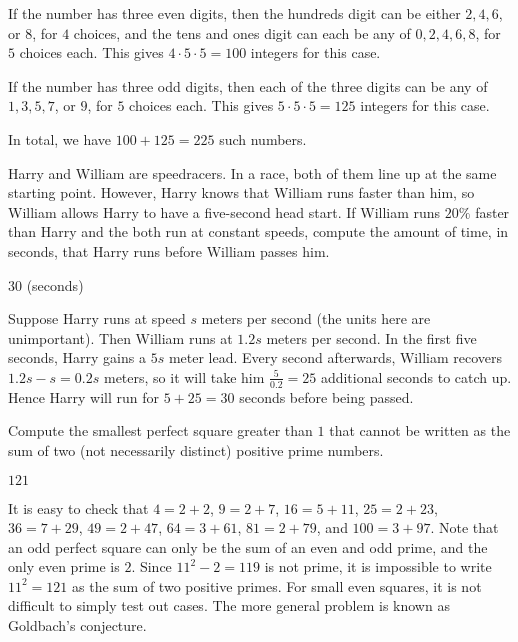 \documentclass[11pt]{article}
\begin{document}
\begin{solution}
If the number has three even digits, then the hundreds digit can be either $2, 4, 6$, or $8$, for $4$ choices,
and the tens and ones digit can each be any of $0, 2, 4, 6, 8$, for $5$ choices each.
This gives $4 \cdot 5 \cdot 5 = 100$ integers for this case. \newline

If the number has three odd digits, then each of the three digits can be any of $1, 3, 5, 7$, or $9$, for
$5$ choices each. This gives $5 \cdot 5 \cdot 5 = 125$ integers for this case. \newline

In total, we have $100 + 125 = \boxed{225}$ such numbers.
\end{solution}


\begin{problem}%
Harry and William are speedracers. In a race, both of them line up at the same starting point.
However, Harry knows that William runs faster than him, so William allows Harry to have
a five-second head start. If William runs $20\%$ faster than Harry and the both run at
constant speeds, compute the amount of time, in seconds, that Harry runs before William passes him.
\end{problem}

\begin{answer}
$\boxed{30}$ (seconds)
\end{answer}

\begin{solution}
Suppose Harry runs at speed $s$ meters per second (the units here are unimportant). Then William
runs at $1.2s$ meters per second. In the first five seconds, Harry gains a $5s$ meter lead.
Every second afterwards, William recovers $1.2s - s = 0.2s$ meters, so it will take
him $\frac{5}{0.2} = 25$ additional seconds to catch up. Hence Harry will run for $5 + 25 = \boxed{30}$
seconds before being passed.
\end{solution}


\begin{problem}%
Compute the smallest perfect square greater than $1$ that cannot be written as the sum of two
(not necessarily distinct) positive prime numbers.
\end{problem}

\begin{answer}
$\boxed{121}$
\end{answer}

\begin{solution}
It is easy to check that $4 = 2+2$, $9 = 2+7$, $16 = 5+11$, $25 = 2+23$, $36 = 7+29$, $49 = 2+47$,
$64 = 3+61$, $81 = 2+79$, and $100 = 3+97$. Note that an odd perfect square can only be the
sum of an even and odd prime, and the only even prime is $2$. Since $11^2 - 2 = 119$ is not prime,
it is impossible to write $11^2 = \boxed{121}$ as the sum of two positive primes.
For small even squares, it is not difficult to simply test out cases. The more general problem
is known as Goldbach's conjecture.
\end{solution}
\end{document}
